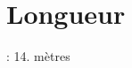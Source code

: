 \hypertarget{_longueur-example}{}\section{Longueur}
\+: 14. mètres


\begin{DoxyCodeInclude}
\end{DoxyCodeInclude}
 